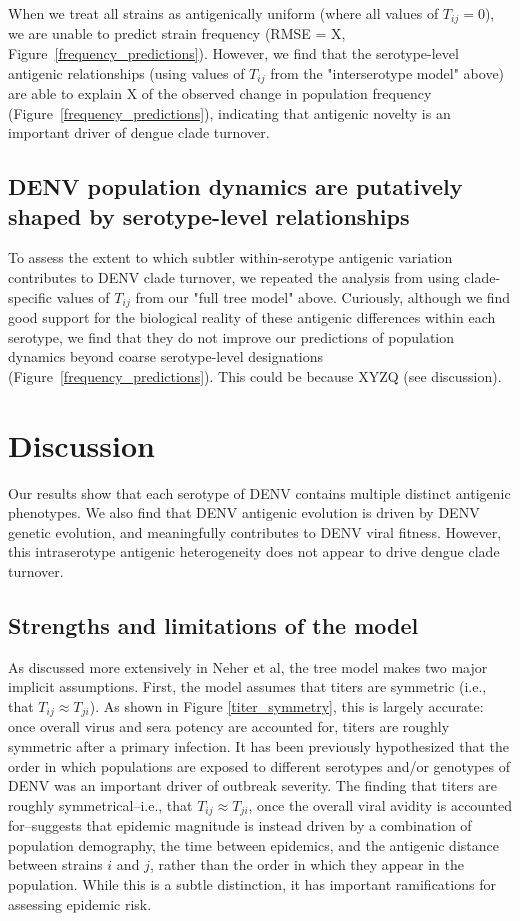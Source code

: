 \documentclass[11pt,oneside,letterpaper]{article}
\begin{document}
When we treat all strains as antigenically uniform (where all values of $T_{ij} = 0$), we are unable to predict strain frequency (RMSE = X, Figure~\ref{frequency_predictions}).
However, we find that the serotype-level antigenic relationships (using values of $T_{ij}$ from the "interserotype model" above) are able to explain X of the observed change in population frequency (Figure~\ref{frequency_predictions}), indicating that antigenic novelty is an important driver of dengue clade turnover.

\subsection*{DENV population dynamics are putatively shaped by serotype-level relationships}
To assess the extent to which subtler within-serotype antigenic variation contributes to DENV clade turnover, we repeated the analysis from  using clade-specific values of $T_{ij}$ from our "full tree model" above.
Curiously, although we find good support for the biological reality of these antigenic differences within each serotype, we find that they do not improve our predictions of population dynamics beyond coarse serotype-level designations (Figure~\ref{frequency_predictions}).
This could be because XYZQ (see discussion).


\section*{Discussion}
Our results show that each serotype of DENV contains multiple distinct antigenic phenotypes. We also find that DENV antigenic evolution is driven by DENV genetic evolution, and meaningfully contributes to DENV viral fitness. However, this intraserotype antigenic heterogeneity does not appear to drive dengue clade turnover.

\subsection*{Strengths and limitations of the model}
As discussed more extensively in Neher et al, the tree model makes two major implicit assumptions.
First, the model assumes that titers are symmetric (i.e., that $T_{ij} \approx T_{ji}$).
As shown in Figure \ref{titer_symmetry}, this is largely accurate: once overall virus and sera potency are accounted for, titers are roughly symmetric after a primary infection.
It has been previously hypothesized that the order in which populations are exposed to different serotypes and/or genotypes of DENV was an important driver of outbreak severity.
The finding that titers are roughly symmetrical--i.e., that $T_{ij} \approx T_{ji}$, once the overall viral avidity is accounted for--suggests that epidemic magnitude is instead driven by a combination of population demography, the time between epidemics, and the antigenic distance between strains $i$ and $j$, rather than the order in which they appear in the population.
While this is a subtle distinction, it has important ramifications for assessing epidemic risk.
\end{document}

